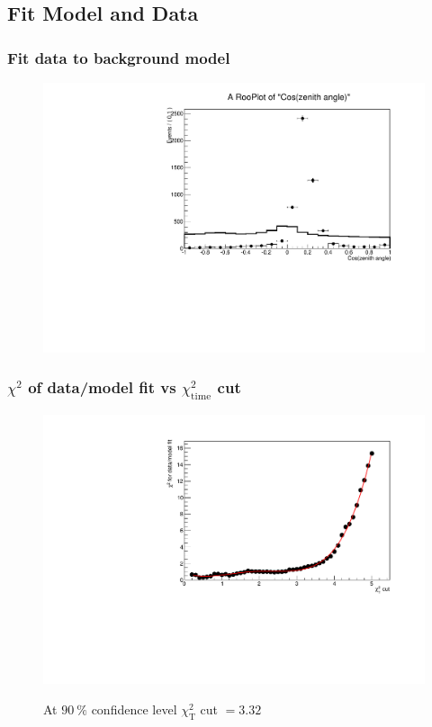 \documentclass{beamer}
\begin{document}
\subsection{Fit Model and Data}
\begin{frame}
	\frametitle{Fit data to background model}
	\begin{figure}
		\centering
		\includegraphics[width=0.85\linewidth]{fit_data_to_bkg_model_noChi2TCut.pdf}
	\end{figure}
\end{frame}

\begin{frame}
	\frametitle{$\chi^{2}$ of data/model fit vs $\chi^{2}_{\mathrm{time}}$ cut}
	\begin{figure}
		\centering
		\includegraphics[width=0.8\linewidth]{chi2tcut_vs_fitGoodness.pdf}

		At $\SI{90}{\percent}$ confidence level $\chi^{2}_{\mathrm{T}}$ cut
		$= 3.32$
	\end{figure}
\end{frame}
\end{document}
